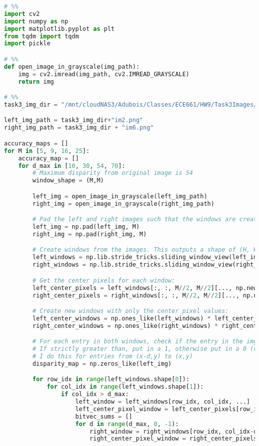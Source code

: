 \documentclass{article}
\begin{document}
\begin{lstlisting}[language=Python]
# %%
import cv2
import numpy as np
import matplotlib.pyplot as plt
from tqdm import tqdm
import pickle

# %%
def open_image_in_grayscale(img_path):
    img = cv2.imread(img_path, cv2.IMREAD_GRAYSCALE)
    return img

# %%
task3_img_dir = "/mnt/cloudNAS3/Adubois/Classes/ECE661/HW9/Task3Images/"

left_img_path = task3_img_dir+"im2.png"
right_img_path = task3_img_dir + "im6.png"

accuracy_maps = []
for M in [5, 9, 16, 25]:
    accuracy_map = []
    for d_max in [10, 30, 54, 70]:
        # Maximum disparity from original image is 54
        window_shape = (M,M)

        left_img = open_image_in_grayscale(left_img_path)
        right_img = open_image_in_grayscale(right_img_path)

        # Pad the left and right images such that the windows are created for all image pixels
        left_img = np.pad(left_img, M)
        right_img = np.pad(right_img, M)

        # Create windows from the images. This outputs a shape of (H, W, M, M) for an MxM window centered on each pixel
        left_windows = np.lib.stride_tricks.sliding_window_view(left_img, window_shape)
        right_windows = np.lib.stride_tricks.sliding_window_view(right_img, window_shape)

        # Get the center pixels for each window:
        left_center_pixels = left_windows[:, :, M//2, M//2][..., np.newaxis, np.newaxis]
        right_center_pixels = right_windows[:, :, M//2, M//2][..., np.newaxis, np.newaxis]

        # Create new windows with only the center pixel values:
        left_center_windows = np.ones_like(left_windows) * left_center_pixels
        right_center_windows = np.ones_like(right_windows) * right_center_pixels

        # For each entry in both windows, check if the entry in the img window is strictly larger than the center pixel value
        # If strictly greater than, put in a 1, otherwise put in a 0 (right now these are True and False values)
        # I do this for entries from (x-d,y) to (x,y)
        disparity_map = np.zeros_like(left_img)

        for row_idx in range(left_windows.shape[0]):
            for col_idx in range(left_windows.shape[1]):
                if col_idx > d_max:
                    left_window = left_windows[row_idx, col_idx, ...]
                    left_center_pixel_window = left_center_pixels[row_idx, col_idx, ...]
                    bitvec_sums = []
                    for d in range(d_max, 0, -1):
                        right_window = right_windows[row_idx, col_idx-d]
                        right_center_pixel_window = right_center_pixels[row_idx, col_idx-d, ...]
                        

\end{lstlisting}
\end{document}
